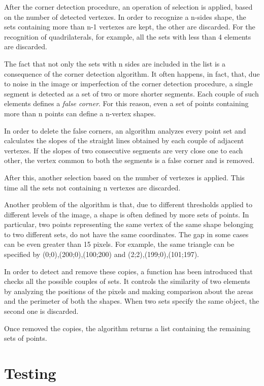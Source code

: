 		After the corner detection procedure, an operation of selection is applied, based on the number of detected vertexes.
		In order to recognize a n-sides shape, the sets containing more than n-1 vertexes are kept, the other are discarded.
		For the recognition of quadrilaterals, for example, all the sets with less than 4 elements are discarded.
		


		The fact that not only the sets with n sides are included in the list is a consequence of the corner detection algorithm. 
		It often happens, in fact, that, due to noise in the image or imperfection of the corner detection procedure, a single segment is detected as a set of two or more shorter segments. 
		Each couple of such elements defines a \emph{false corner}. 
		For this reason, even a set of points containing more than n points can define a n-vertex shapes. 
		


		In order to delete the false corners, an algorithm analyzes every point set and calculates the slopes of the straight lines obtained by each couple of adjacent vertexes. 
		If the slopes of two consecutive segments are very close one to each other, the vertex common to both the segments is a false corner and is removed.
		

		
		After this, another selection based on the number of vertexes is applied. This time all the sets not containing n vertexes are discarded.
		
		
		
		Another problem of the algorithm is that, due to different thresholds applied to different levels of the image, a shape is often defined by more sets of points.
		In particular, two points representing the same vertex of the same shape belonging to two different sets, do not have the same coordinates.
		The gap in some cases can be even greater than 15 pixels. 
		For example, the same triangle can be specified by {(0;0),(200;0),(100;200)} and {(2;2),(199;0),(101;197)}. 
		
		

		In order to detect and remove these copies, a function has been introduced that checks all the possible couples of sets. 
		It controls the similarity of two elements by analyzing the positions of the pixels and making comparison about the areas and the perimeter of both the shapes. 
		When two sets specify the same object, the second one is discarded. 
		
		Once removed the copies, the algorithm returns a list containing the remaining sets of points.

		
	

	

	\section{Testing}

